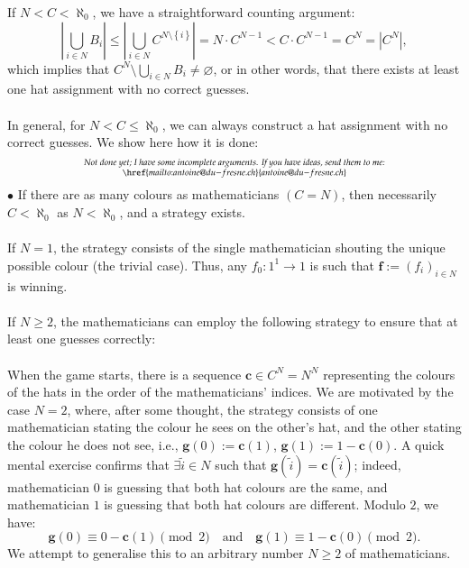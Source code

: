 \documentclass[11pt, a4paper, oneside]{article}
\theoremstyle{remark}
\theoremstyle{lemma}
\begin{document}
If \(N < C < \aleph_0\), we have a straightforward counting argument:
\[
\left| \bigcup_{i \in N} B_i \right| \leq \left| \bigcup_{i \in N} C^{N \setminus \left\{i\right\}} \right| = N \cdot C^{N - 1} < C \cdot C^{N - 1} = C^N = \left| C^N \right|,
\]
which implies that \(C^N \setminus \bigcup_{i \in N} B_i \neq \varnothing\), or in other words, that there exists at least one hat assignment with no correct guesses.
\\\\
In general, for \(N < C \leq \aleph_0\), we can always construct a hat assignment with no correct guesses. We show here how it is done:
\[
\substack{\textit{Not done yet; I have some incomplete arguments. If you have ideas, send them to me:} \\ \href{mailto:antoine@du-fresne.ch}{antoine@du-fresne.ch}}
\]
$\bullet$ If there are as many colours as mathematicians \(\left(C = N\right)\), then necessarily \(C < \aleph_0\) as \(N < \aleph_0\), and a strategy exists.
\\\\
If \(N = 1\), the strategy consists of the single mathematician shouting the unique possible colour (the trivial case). Thus, any \(f_0 : 1^1 \rightarrow 1\) is such that \(\mathbf{f} := \left(f_i\right)_{i \in N}\) is winning.
\\\\
If \(N \geq 2\), the mathematicians can employ the following strategy to ensure that at least one guesses correctly:
\\\\
When the game starts, there is a sequence \(\mathbf{c} \in C^{N} = N^N\) representing the colours of the hats in the order of the mathematicians’ indices. 
We are motivated by the case \(N = 2\), where, after some thought, the strategy consists of one mathematician stating the colour he sees on the other’s hat, and the other stating the colour he does not see, i.e., \(\mathbf{g}(0) := \mathbf{c}(1)\), \(\mathbf{g}(1) := 1 - \mathbf{c}(0)\). A quick mental exercise confirms that \(\exists \tilde{i} \in N\) such that \(\mathbf{g}(\tilde{i}) = \mathbf{c}(\tilde{i})\); indeed, mathematician \(0\) is guessing that both hat colours are the same, and mathematician \(1\) is guessing that both hat colours are different. Modulo \(2\), we have:
\[
\mathbf{g}(0) \equiv 0 - \mathbf{c}(1) \pmod{2} \quad \text{and} \quad \mathbf{g}(1) \equiv 1 - \mathbf{c}(0) \pmod{2}.
\]
We attempt to generalise this to an arbitrary number \(N \geq 2\) of mathematicians.
\\\\
\end{document}
